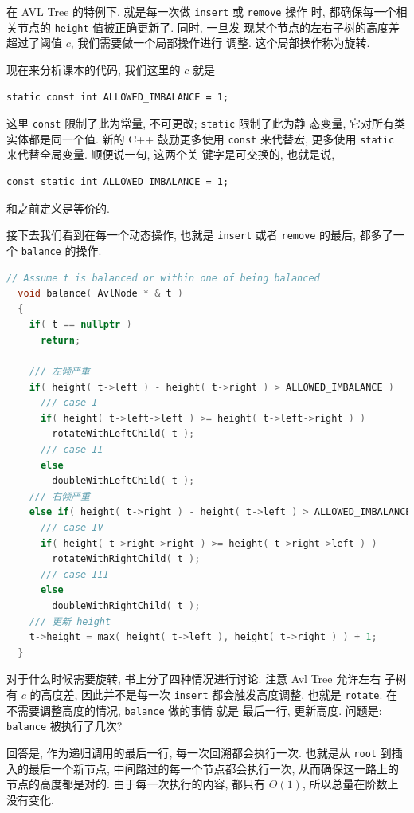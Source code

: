 \documentclass[a4paper]{ctexart}
\theoremstyle{definition}
\theoremstyle{definition}
\begin{document}
在 AVL Tree 的特例下, 就是每一次做 \verb|insert| 或 \verb|remove| 操作
时, 都确保每一个相关节点的 \verb|height| 值被正确更新了. 同时, 一旦发
现某个节点的左右子树的高度差超过了阈值 $c$, 我们需要做一个局部操作进行
调整. 这个局部操作称为旋转.

现在来分析课本的代码, 我们这里的 $c$ 就是
\begin{verbatim}
static const int ALLOWED_IMBALANCE = 1;
\end{verbatim}
这里 \verb|const| 限制了此为常量, 不可更改; \verb|static| 限制了此为静
态变量, 它对所有类实体都是同一个值. 新的 C++ 鼓励更多使用 \verb|const|
来代替宏, 更多使用 \verb|static| 来代替全局变量. 顺便说一句, 这两个关
键字是可交换的, 也就是说,
\begin{verbatim}
const static int ALLOWED_IMBALANCE = 1;
\end{verbatim}
和之前定义是等价的.

接下去我们看到在每一个动态操作, 也就是 \verb|insert| 或者
\verb|remove| 的最后, 都多了一个 \verb|balance| 的操作.

\begin{lstlisting}[language=C++]
  // Assume t is balanced or within one of being balanced
  void balance( AvlNode * & t )
  {
    if( t == nullptr )
      return;

    /// 左倾严重  
    if( height( t->left ) - height( t->right ) > ALLOWED_IMBALANCE )
      /// case I
      if( height( t->left->left ) >= height( t->left->right ) )
        rotateWithLeftChild( t );
      /// case II
      else
        doubleWithLeftChild( t );
    /// 右倾严重  
    else if( height( t->right ) - height( t->left ) > ALLOWED_IMBALANCE )
      /// case IV
      if( height( t->right->right ) >= height( t->right->left ) )
        rotateWithRightChild( t );
      /// case III
      else
        doubleWithRightChild( t );
    /// 更新 height            
    t->height = max( height( t->left ), height( t->right ) ) + 1;
  }
\end{lstlisting}

对于什么时候需要旋转, 书上分了四种情况进行讨论. 注意 Avl Tree 允许左右
子树有 $c$ 的高度差, 因此并不是每一次 \verb|insert| 都会触发高度调整,
也就是 \verb|rotate|. 在不需要调整高度的情况, \verb|balance| 做的事情
就是 最后一行, 更新高度. 问题是: \verb|balance| 被执行了几次?

回答是, 作为递归调用的最后一行, 每一次回溯都会执行一次. 也就是从
\verb|root| 到插入的最后一个新节点, 中间路过的每一个节点都会执行一次,
从而确保这一路上的节点的高度都是对的. 由于每一次执行的内容, 都只有
$\Theta(1)$, 所以总量在阶数上没有变化.
\end{document}

